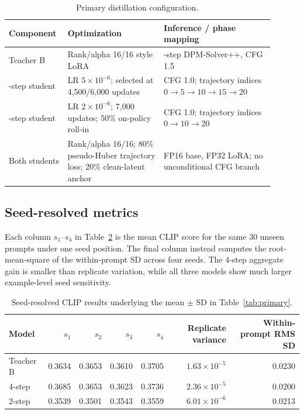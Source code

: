 \documentclass{article}
\begin{document}
\begin{table}[h]
  \caption{Primary distillation configuration.}
  \label{tab:appendix-config}
  \centering
  \small
  \setlength{\tabcolsep}{4pt}
  \begin{tabular}{>{\raggedright\arraybackslash}p{0.17\linewidth}
                  >{\raggedright\arraybackslash}p{0.34\linewidth}
                  >{\raggedright\arraybackslash}p{0.39\linewidth}}
    \toprule
    Component & Optimization & Inference / phase mapping \\
    \midrule
    Teacher B & Rank/alpha 16/16 style LoRA & 20-step DPM-Solver++, CFG 1.5 \\
    4-step student & LR $5\times10^{-6}$; selected at 4,500/6,000 updates &
      CFG 1.0; trajectory indices $0\!\to\!5\!\to\!10\!\to\!15\!\to\!20$ \\
    2-step student & LR $2\times10^{-6}$; 7,000 updates; 50\% on-policy roll-in &
      CFG 1.0; trajectory indices $0\!\to\!10\!\to\!20$ \\
    Both students & Rank/alpha 16/16; 80\% pseudo-Huber trajectory loss; 20\%
      clean-latent anchor & FP16 base, FP32 LoRA; no unconditional CFG branch \\
    \bottomrule
  \end{tabular}
\end{table}

\subsection{Seed-resolved metrics}
Each column $s_1$--$s_4$ in Table~\ref{tab:seed-resolved} is the mean CLIP score
for the same 30 unseen prompts under one seed position.  The final column instead
computes the root-mean-square of the within-prompt SD across four seeds.  The
4-step aggregate gain is smaller than replicate variation, while all three
models show much larger example-level seed sensitivity.

\begin{table}[h]
  \caption{Seed-resolved CLIP results underlying the mean $\pm$ SD in
  Table~\ref{tab:primary}.}
  \label{tab:seed-resolved}
  \centering
  \small
  \setlength{\tabcolsep}{4pt}
  \begin{tabular}{lrrrrrr}
    \toprule
    Model & $s_1$ & $s_2$ & $s_3$ & $s_4$ & Replicate variance & Within-prompt RMS SD \\
    \midrule
    Teacher B & 0.3634 & 0.3653 & 0.3610 & 0.3705 & $1.63\times10^{-5}$ & 0.0230 \\
    4-step & 0.3685 & 0.3653 & 0.3623 & 0.3736 & $2.36\times10^{-5}$ & 0.0200 \\
    2-step & 0.3539 & 0.3501 & 0.3543 & 0.3559 & $6.01\times10^{-6}$ & 0.0213 \\
    \bottomrule
  \end{tabular}
\end{table}
\end{document}
